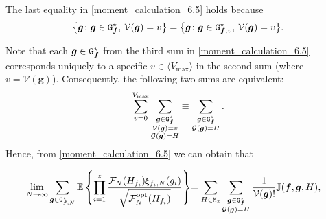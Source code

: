 \documentclass[11pt,reqno]{amsart}
\numberwithin{equation}{section}
\newcommand{\sprod}[1]{\langle#1\rangle}
\newcommand{\E}[1]{\mathbb{E}\left\{ #1\right\}}
\newcommand{\kb}[1]{\boldsymbol{#1}}
\newcommand{\vk}[1]{\kb{#1}}
\begin{document}
{The last equality in \eqref{moment_calculation_6.5} holds because
\begin{align*}
    \bigl\{\vk g\colon \vk g\in {\tt G}_{\vk f}^{\star},\, \mathcal{V}(\vk g) = v\bigr\} = \bigl\{\vk g\colon \vk g\in {\tt G}_{\vk f, v}^{\star},\, \mathcal{V}(\vk g) = v\bigr\}.
\end{align*}

\noindent 
Note that each \( \vk g \in {\tt G}_{\vk f}^{\star} \) from the third sum in \eqref{moment_calculation_6.5} corresponds uniquely to a specific \( v \in \sprod{V_{\max}} \) in the second sum (where \( v = \mathcal{V}(\vk g) \)). Consequently, the following two sums are equivalent:
\begin{align*}
    \sum_{v=0}^{V_{\max}} \sum_{\substack{\vk g \in {\tt G}^{\star}_{\vk f} \\ 
    \mathcal{V}\left(\vk g\right) = v \\ \mathcal{G}(\vk g) = {H}}} 
    \equiv \sum_{\substack{\vk g \in {\tt G}^{\star}_{\vk f} \\ \mathcal{G}(\vk g) = {H}}}.
\end{align*}
Hence, from \eqref{moment_calculation_6.5} we can obtain that}
\begin{align}
    {\lim_{N\to\infty}}\sum_{\vk g\in{\tt G}^{\star}_{\vk f,N}}\E{\prod_{i=1}^{z}\frac{\mathcal{F}_{{N}}({H}_{f_i})\xi_{f_i,{N}}(g_i)}{\sqrt{\mathcal{F}^{\rm opt}_N({H}_{f_i})}}}
     &{=\sum_{{H}\in{\tt M}_z}\sum_{\substack{\vk g\in
     {\tt G}^{\star}_{\vk f} \\ \mathcal{G}(\vk g)={H}}}\frac{1}{\mathcal{V}(\vk g)!}{\mathbb J}({\vk f},{\vk g},H)},\label{moment_calculation_7}
\end{align}
\end{document}
